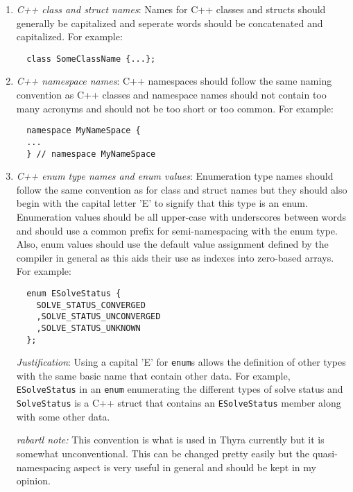 \begin{enumerate}

{}\item\textit{C++ class and struct names}: Names for C++ classes and structs
should generally be capitalized and seperate words should be concatenated and
capitalized.  For example:

{\small\begin{verbatim}
  class SomeClassName {...};
\end{verbatim}}

{}\item\textit{C++ namespace names}: C++ namespaces should follow the same
naming convention as C++ classes and namespace names should not contain too
many acronyms and should not be too short or too common.  For example:

{\small\begin{verbatim}
  namespace MyNameSpace {
  ...
  } // namespace MyNameSpace 
\end{verbatim}}

{}\item\textit{C++ enum type names and enum values}: Enumeration type names
should follow the same convention as for class and struct names but they
should also begin with the capital letter 'E' to signify that this type is an
enum.  Enumeration values should be all upper-case with underscores between
words and should use a common prefix for semi-namespacing with the enum type.
Also, enum values should use the default value assignment defined by the
compiler in general as this aids their use as indexes into zero-based arrays.
For example:

{\small\begin{verbatim}
  enum ESolveStatus {
    SOLVE_STATUS_CONVERGED
    ,SOLVE_STATUS_UNCONVERGED
    ,SOLVE_STATUS_UNKNOWN
  };
\end{verbatim}}

{}\textit{Justification}: Using a capital 'E' for {}\texttt{enum}s allows the
definition of other types with the same basic name that contain other data.
For example, {}\texttt{ESolveStatus} in an {}\texttt{enum} enumerating the
different types of solve status and {}\texttt{SolveStatus} is a C++ struct
that contains an {}\texttt{ESolveStatus} member along with some other data.

{}\textit{rabartl note:} This convention is what is used in Thyra currently but it
is somewhat unconventional.  This can be changed pretty easily but the
quasi-namespacing aspect is very useful in general and should be kept in my
opinion.


\end{enumerate}
